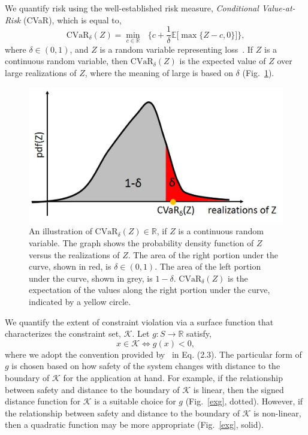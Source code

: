 \documentclass[letterpaper, 10 pt, conference]{ieeeconf}  %
\begin{document}
We quantify risk using the well-established risk measure, \textit{Conditional Value-at-Risk} (CVaR), which is equal to,
\begin{equation}
\text{CVaR}_\delta(Z) = {\underset{c \in \mathbb{R}}\min} \text{ }\Big\{ c + \frac{1}{\delta}\mathbb{E}\big[\max\{Z-c,0\}\big] \Big\},
\end{equation}
where $\delta \in (0,1)$, and $Z$ is a random variable representing loss~\cite{rockafellar2000optimization}.\footnotemark
{}
If $Z$ is a continuous random variable, then $\text{CVaR}_\delta(Z)$ is the expected value of $Z$ over large realizations of $Z$,
where the meaning of large is based on $\delta$ (Fig.~\ref{cvar}).

\begin{figure}[thpb]
      \centering
      \includegraphics[scale=0.5]{cvar.jpg}
      \caption{An illustration of $\text{CVaR}_\delta(Z) \in \mathbb{R}$, if $Z$ is a continuous random variable. 
	  The graph shows the probability density function of $Z$ versus the realizations of $Z$.
	  The area of the right portion under the curve, shown in red, is $\delta \in (0,1)$.	  
	  The area of the left portion under the curve, shown in grey, is $1-\delta$.
	  $\text{CVaR}_\delta(Z)$ is the expectation of the values along the right portion under the curve, indicated by a yellow circle.}
      \label{cvar}
\end{figure}

We quantify the extent of constraint violation via a surface function that characterizes the constraint set, $\mathcal{K}$.
Let $g: S \rightarrow \mathbb{R}$ satisfy,
\begin{equation}
x \in \mathcal{K} \iff g(x) < 0,
\label{g}
\end{equation}
where we adopt the convention provided by~\cite{EECS-2018-41} in Eq. (2.3). 
The particular form of $g$ is chosen based on how safety of the system changes with distance to the boundary of $\mathcal{K}$ for the application at hand.
For example, if the relationship between safety and distance to the boundary of $\mathcal{K}$ is linear, 
then the signed distance function for $\mathcal{K}$ is a suitable choice for $g$ (Fig.~\ref{exg}, dotted).
However, if the relationship between safety and distance to the boundary of $\mathcal{K}$ is non-linear,
then a quadratic function may be more appropriate (Fig.~\ref{exg}, solid).
\end{document}
